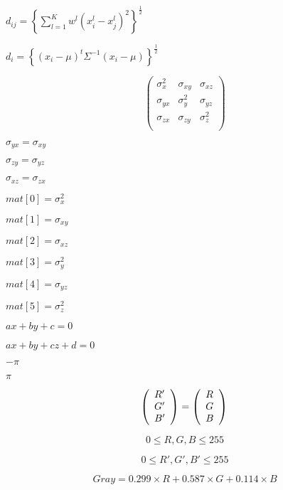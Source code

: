 \documentclass{article}
\begin{document}
$ d_{ij} = \left\{ \sum _{l = 1}^{K} w^{l} \left( x_{i}^{l} - x_{j}^{l} \right)^{2} \right\}^\frac{1}{2} $
\pagebreak

$ d_{i} = \left\{ \left( x_{i} - \mu \right)^{t} \Sigma^{-1} \left( x_{i} - \mu \right) \right\}^\frac{1}{2} $
\pagebreak

\[ \left( \begin{array}{ccc} \sigma_{x}^{2} & \sigma_{xy} & \sigma_{xz} \\ \sigma_{yx} & \sigma_{y}^{2} & \sigma_{yz} \\ \sigma_{zx} & \sigma_{zy} & \sigma_{z}^{2} \\ \end{array} \right) \]
\pagebreak

$ \sigma_{yx}=\sigma_{xy} $
\pagebreak

$ \sigma_{zy}=\sigma_{yz} $
\pagebreak

$ \sigma_{xz}=\sigma_{zx} $
\pagebreak

$ mat[0]=\sigma_{x}^{2} $
\pagebreak

$ mat[1]=\sigma_{xy} $
\pagebreak

$ mat[2]=\sigma_{xz} $
\pagebreak

$ mat[3]=\sigma_{y}^{2} $
\pagebreak

$ mat[4]=\sigma_{yz} $
\pagebreak

$ mat[5]=\sigma_{z}^{2} $
\pagebreak

$ ax + by + c = 0 $
\pagebreak

$ ax + by + cz + d = 0 $
\pagebreak

$-\pi$
\pagebreak

$\pi$
\pagebreak

\[ \left( \begin{array}{l} R' \\ G' \\ B' \\ \end{array} \right) = \left( \begin{array}{l} R \\ G \\ B \\ \end{array} \right) \\ \]
\pagebreak

\[ 0 \le R, G, B \le 255 \]
\pagebreak

\[ 0 \le R', G', B' \le 255 \]
\pagebreak

\[ Gray = 0.299 \times R + 0.587 \times G + 0.114 \times B \]
\pagebreak
\end{document}
